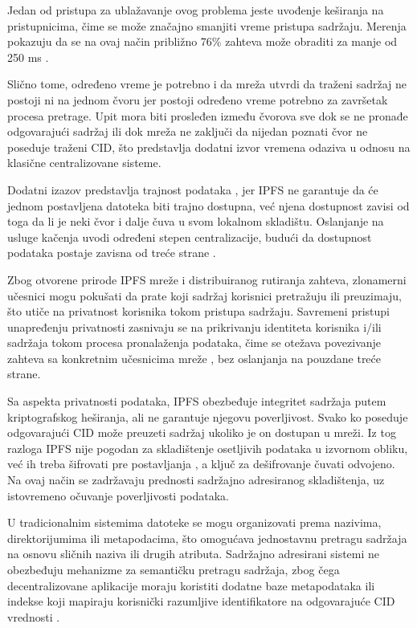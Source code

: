 Jedan od pristupa za ublažavanje ovog problema jeste uvođenje keširanja na pristupnicima, čime se može značajno smanjiti vreme pristupa sadržaju. Merenja pokazuju da se na ovaj način približno 76\% zahteva može obraditi za manje od 250 ms \cite{trautwein2022design}.

Slično tome, određeno vreme je potrebno i da mreža utvrdi da traženi sadržaj ne postoji ni na jednom čvoru jer postoji određeno vreme potrebno za završetak procesa pretrage. Upit mora biti prosleđen između čvorova sve dok se ne pronađe odgovarajući sadržaj ili dok mreža ne zaključi da nijedan poznati čvor ne poseduje traženi CID, što predstavlja dodatni izvor vremena odaziva u odnosu na klasične centralizovane sisteme.

Dodatni izazov predstavlja trajnost podataka , jer IPFS ne garantuje da će jednom postavljena datoteka biti trajno dostupna, već njena dostupnost zavisi od toga da li je neki čvor i dalje čuva u svom lokalnom skladištu. Oslanjanje na usluge kačenja uvodi određeni stepen centralizacije, budući da dostupnost podataka postaje zavisna od treće strane \cite{lamichhane2024verifiable}.

Zbog otvorene prirode IPFS mreže i distribuiranog rutiranja zahteva, zlonamerni učesnici mogu pokušati da prate koji sadržaj korisnici pretražuju ili preuzimaju, što utiče na privatnost korisnika tokom pristupa sadržaju. Savremeni pristupi unapređenju privatnosti zasnivaju se na prikrivanju identiteta korisnika i/ili sadržaja tokom procesa pronalaženja podataka, čime se otežava povezivanje zahteva sa konkretnim učesnicima mreže \cite{katsantas2024enhancing}, bez oslanjanja na pouzdane treće strane.

Sa aspekta privatnosti podataka, IPFS obezbeđuje integritet sadržaja putem kriptografskog heširanja, ali ne garantuje njegovu poverljivost. Svako ko poseduje odgovarajući CID može preuzeti sadržaj ukoliko je on dostupan u mreži. Iz tog razloga IPFS nije pogodan za skladištenje osetljivih podataka u izvornom obliku, već ih treba šifrovati pre postavljanja \cite{manakhari2024enhancing}, a ključ za dešifrovanje čuvati odvojeno. Na ovaj način se zadržavaju prednosti sadržajno adresiranog skladištenja, uz istovremeno očuvanje poverljivosti podataka.

U tradicionalnim sistemima datoteke se mogu organizovati prema nazivima, direktorijumima ili metapodacima, što omogućava jednostavnu pretragu sadržaja na osnovu sličnih naziva ili drugih atributa. Sadržajno adresirani sistemi ne obezbeđuju mehanizme za semantičku pretragu sadržaja, zbog čega decentralizovane aplikacije moraju koristiti dodatne baze metapodataka ili indekse koji mapiraju korisnički razumljive identifikatore na odgovarajuće CID vrednosti \cite{shevarev2025dynamic}.

